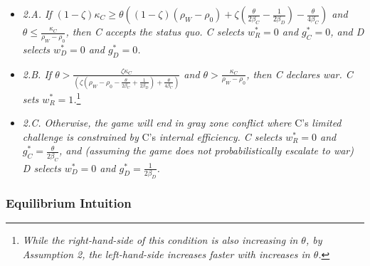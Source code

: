 \documentclass[
]{article}
\begin{document}
\begin{itemize}
  \item \textit{2.A. If $(1-\zeta)\kappa_{C}\geq\theta\left((1-\zeta)(\rho_{W}-\rho_{0})+\zeta\left(\frac{\theta}{2\beta_{C}}-\frac{1}{2\beta_{D}}\right)-\frac{\theta}{4\beta_{C}}\right)$ and $\theta\leq\frac{\kappa_{C}}{\rho_{W}-\rho_{0}}$, then C accepts the status quo. C selects $w_{R}^{*}=0$ and $g_{C}^{*}=0$, and D selects $w_{D}^{*}=0$ and $g_{D}^{*}=0$. } 
  \item \textit{2.B. If $\theta>\frac{\zeta\kappa_{C}}{\left(\zeta\left(\rho_{W}-\rho_{0}-\frac{\theta}{2\beta_{C}}+\frac{1}{2\beta_{D}}\right)+\frac{\theta}{4\beta_{C}}\right)}$ and $\theta>\frac{\kappa_{C}}{\rho_{W}-\rho_{0}}$, then C declares war. C sets $w_{R}^{*}=1$.}\footnote{\textit{While the right-hand-side of this condition is also increasing in $\theta$, by Assumption 2, the left-hand-side increases faster with increases in $\theta$.}}\textit{ } 
  \item \textit{2.C. Otherwise, the game will end in gray zone conflict where }C's\textit{ limited challenge is constrained by }C's\textit{ internal efficiency. C selects $w_{R}^{*}=0$ and $g_{C}^{*}=\frac{\theta}{2\beta_{C}}$, and (assuming the game does not probabilistically escalate to war) D selects $w_{D}^{*}=0$ and $g_{D}^{*}=\frac{1}{2\beta_{D}}$. } 
  \end{itemize}

\hypertarget{equilibrium-intuition-1}{%
\subsubsection{Equilibrium Intuition}\label{equilibrium-intuition-1}}
\end{document}
